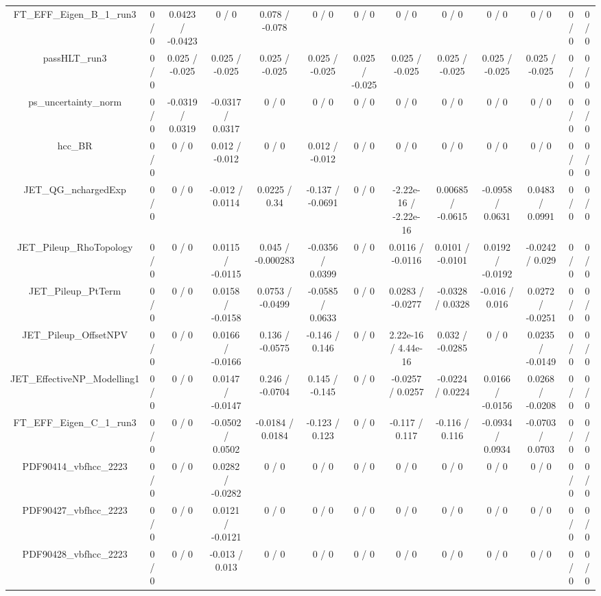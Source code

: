 \documentclass[10pt]{article}
\begin{document}
\begin{table}[htbp]
\begin{center}
\begin{tabular}{|c|c|c|c|c|c|c|c|c|c|c|c|c|}
  FT_EFF_Eigen_B_1_run3 & 0 / 0 & 0.0423 / -0.0423 & 0 / 0 & 0.078 / -0.078 & 0 / 0 & 0 / 0 & 0 / 0 & 0 / 0 & 0 / 0 & 0 / 0 & 0 / 0 & 0 / 0 \\ 
  passHLT_run3 & 0 / 0 & 0.025 / -0.025 & 0.025 / -0.025 & 0.025 / -0.025 & 0.025 / -0.025 & 0.025 / -0.025 & 0.025 / -0.025 & 0.025 / -0.025 & 0.025 / -0.025 & 0.025 / -0.025 & 0 / 0 & 0 / 0 \\ 
  ps_uncertainty_norm & 0 / 0 & -0.0319 / 0.0319 & -0.0317 / 0.0317 & 0 / 0 & 0 / 0 & 0 / 0 & 0 / 0 & 0 / 0 & 0 / 0 & 0 / 0 & 0 / 0 & 0 / 0 \\ 
  hcc_BR & 0 / 0 & 0 / 0 & 0.012 / -0.012 & 0 / 0 & 0.012 / -0.012 & 0 / 0 & 0 / 0 & 0 / 0 & 0 / 0 & 0 / 0 & 0 / 0 & 0 / 0 \\ 
  JET_QG_nchargedExp & 0 / 0 & 0 / 0 & -0.012 / 0.0114 & 0.0225 / 0.34 & -0.137 / -0.0691 & 0 / 0 & -2.22e-16 / -2.22e-16 & 0.00685 / -0.0615 & -0.0958 / 0.0631 & 0.0483 / 0.0991 & 0 / 0 & 0 / 0 \\ 
  JET_Pileup_RhoTopology & 0 / 0 & 0 / 0 & 0.0115 / -0.0115 & 0.045 / -0.000283 & -0.0356 / 0.0399 & 0 / 0 & 0.0116 / -0.0116 & 0.0101 / -0.0101 & 0.0192 / -0.0192 & -0.0242 / 0.029 & 0 / 0 & 0 / 0 \\ 
  JET_Pileup_PtTerm & 0 / 0 & 0 / 0 & 0.0158 / -0.0158 & 0.0753 / -0.0499 & -0.0585 / 0.0633 & 0 / 0 & 0.0283 / -0.0277 & -0.0328 / 0.0328 & -0.016 / 0.016 & 0.0272 / -0.0251 & 0 / 0 & 0 / 0 \\ 
  JET_Pileup_OffsetNPV & 0 / 0 & 0 / 0 & 0.0166 / -0.0166 & 0.136 / -0.0575 & -0.146 / 0.146 & 0 / 0 & 2.22e-16 / 4.44e-16 & 0.032 / -0.0285 & 0 / 0 & 0.0235 / -0.0149 & 0 / 0 & 0 / 0 \\ 
  JET_EffectiveNP_Modelling1 & 0 / 0 & 0 / 0 & 0.0147 / -0.0147 & 0.246 / -0.0704 & 0.145 / -0.145 & 0 / 0 & -0.0257 / 0.0257 & -0.0224 / 0.0224 & 0.0166 / -0.0156 & 0.0268 / -0.0208 & 0 / 0 & 0 / 0 \\ 
  FT_EFF_Eigen_C_1_run3 & 0 / 0 & 0 / 0 & -0.0502 / 0.0502 & -0.0184 / 0.0184 & -0.123 / 0.123 & 0 / 0 & -0.117 / 0.117 & -0.116 / 0.116 & -0.0934 / 0.0934 & -0.0703 / 0.0703 & 0 / 0 & 0 / 0 \\ 
  PDF90414_vbfhcc_2223 & 0 / 0 & 0 / 0 & 0.0282 / -0.0282 & 0 / 0 & 0 / 0 & 0 / 0 & 0 / 0 & 0 / 0 & 0 / 0 & 0 / 0 & 0 / 0 & 0 / 0 \\ 
  PDF90427_vbfhcc_2223 & 0 / 0 & 0 / 0 & 0.0121 / -0.0121 & 0 / 0 & 0 / 0 & 0 / 0 & 0 / 0 & 0 / 0 & 0 / 0 & 0 / 0 & 0 / 0 & 0 / 0 \\ 
  PDF90428_vbfhcc_2223 & 0 / 0 & 0 / 0 & -0.013 / 0.013 & 0 / 0 & 0 / 0 & 0 / 0 & 0 / 0 & 0 / 0 & 0 / 0 & 0 / 0 & 0 / 0 & 0 / 0 \\ 

\end{tabular}
\end{center}
\end{table}
\end{document}
